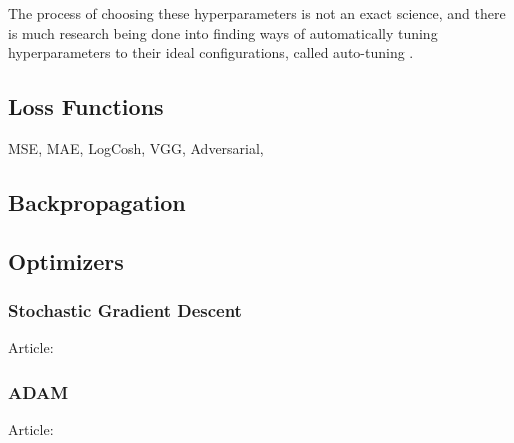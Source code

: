 The process of choosing these hyperparameters is not an exact science, and there is much research being done into finding ways of automatically tuning hyperparameters to their ideal configurations, called auto-tuning \cite{autotuning}.

\subsection{Loss Functions}
MSE, MAE, LogCosh, VGG, Adversarial, 


\subsection{Backpropagation}


\subsection{Optimizers}

\subsubsection{Stochastic Gradient Descent}
Article: \cite{stochasticgradientdescent}

\subsubsection{ADAM}
Article: \cite{kingma2015adam}
